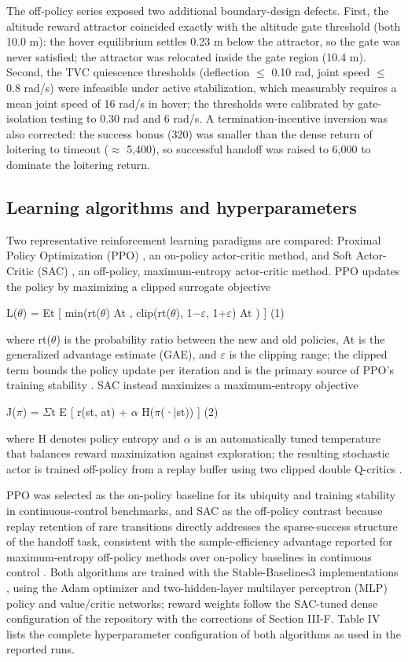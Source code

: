 \documentclass[11pt,a4paper]{article}
\begin{document}
The off-policy series exposed two additional boundary-design defects. First, the altitude reward attractor coincided exactly with the altitude gate threshold (both 10.0 m): the hover equilibrium settles 0.23 m below the attractor, so the gate was never satisfied; the attractor was relocated inside the gate region (10.4 m). Second, the TVC quiescence thresholds (deflection $\le$ 0.10 rad, joint speed $\le$ 0.8 rad/s) were infeasible under active stabilization, which measurably requires a mean joint speed of 16 rad/s in hover; the thresholds were calibrated by gate-isolation testing to 0.30 rad and 6 rad/s. A termination-incentive inversion was also corrected: the success bonus (320) was smaller than the dense return of loitering to timeout ($\approx$ 5,400), so successful handoff was raised to 6,000 to dominate the loitering return.


\subsection{Learning algorithms and hyperparameters}

Two representative reinforcement learning paradigms are compared: Proximal Policy Optimization (PPO) \cite{schulman2017ppo}, an on-policy actor-critic method, and Soft Actor-Critic (SAC) \cite{haarnoja2018sac}, an off-policy, maximum-entropy actor-critic method. PPO updates the policy by maximizing a clipped surrogate objective

L($\theta$) = Et [ min(rt($\theta$) At , clip(rt($\theta$), 1$-$$\varepsilon$, 1+$\varepsilon$) At ) ]	(1)

where rt($\theta$) is the probability ratio between the new and old policies, At is the generalized advantage estimate (GAE), and $\varepsilon$ is the clipping range; the clipped term bounds the policy update per iteration and is the primary source of PPO's training stability \cite{schulman2017ppo}. SAC instead maximizes a maximum-entropy objective

J($\pi$) = $\Sigma$t E [ r(st, at) + $\alpha$ H($\pi$(·|st)) ]	(2)

where H denotes policy entropy and $\alpha$ is an automatically tuned temperature that balances reward maximization against exploration; the resulting stochastic actor is trained off-policy from a replay buffer using two clipped double Q-critics \cite{haarnoja2018sac}.

PPO was selected as the on-policy baseline for its ubiquity and training stability in continuous-control benchmarks, and SAC as the off-policy contrast because replay retention of rare transitions directly addresses the sparse-success structure of the handoff task, consistent with the sample-efficiency advantage reported for maximum-entropy off-policy methods over on-policy baselines in continuous control \cite{haarnoja2018sac}. Both algorithms are trained with the Stable-Baselines3 implementations \cite{raffin2021sb3}, using the Adam optimizer and two-hidden-layer multilayer perceptron (MLP) policy and value/critic networks; reward weights follow the SAC-tuned dense configuration of the repository with the corrections of Section III-F. Table IV lists the complete hyperparameter configuration of both algorithms as used in the reported runs.
\end{document}
